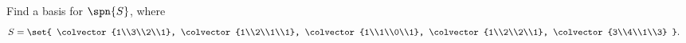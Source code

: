 Find a basis for $\spn{S}$, where 
%
\begin{align*}
S &= \set{
\colvector{1\\3\\2\\1}, 
\colvector{1\\2\\1\\1}, 
\colvector{1\\1\\0\\1}, 
\colvector{1\\2\\2\\1}, 
\colvector{3\\4\\1\\3}
}.
\end{align*}
% 